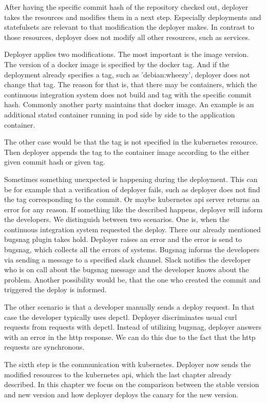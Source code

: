 After having the specific commit hash of the repository checked out, deployer takes the
resources and modifies them in a next step. Especially deployments and statefulsets are
relevant to that modification the deployer makes. In contrast to those resources, deployer
does not modify all other resources, such as services.

Deployer applies two modifications. The most important is the image version. The version
of a docker image is specified by the docker tag. And if the deployment already specifies
a tag, such as 'debian:wheezy', deployer does not change that tag. The reason for that is,
that there may be containers, which the continuous integration system does not build and
tag with the specific commit hash. Commonly another party maintains that docker image. An
example is an additional statsd container running in pod side by side to the application
container.

The other case would be that the tag is not specified in the kubernetes resource. Then
deployer appends the tag to the container image according to the either given commit hash
or given tag.

Sometimes something unexpected is happening during the deployment. This can be for example
that a verification of deployer fails, such as deployer does not find the tag
corresponding to the commit. Or maybe kubernetes api server returns an error for any
reason. If something like the described happens, deployer will inform the developers. We
distinguish between two scenarios. One is, when the continuous integration system
requested the deploy. There our already mentioned bugsnag plugin takes hold. Deployer
raises an error and the error is send to bugsnag, which collects all the errors of
systems. Bugsnag informs the developers via sending a message to a specified slack
channel. Slack notifies the developer who is on call about the bugsnag message and the
developer knows about the problem. Another possibility would be, that the one who created
the commit and triggered the deploy is informed.

The other scenario is that a developer manually sends a deploy request. In that case
the developer typically uses depctl. Deployer discriminates usual curl requests from
requests with depctl. Instead of utilizing bugsnag, deployer answers with an error in the
http response. We can do this due to the fact that the http requests are synchronous.

The sixth step is the communication with kubernetes. Deployer now sends the modified
resources to the kubernetes api, which the last chapter already described. In this chapter
we focus on the comparison between the stable version and new version and how deployer
deploys the canary for the new version.

